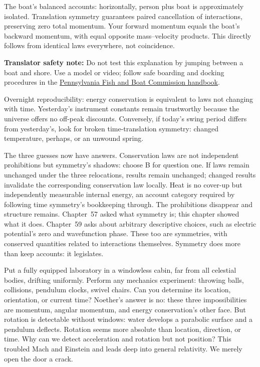The boat's balanced accounts: horizontally, person plus boat is approximately isolated. Translation symmetry guarantees paired cancellation of interactions, preserving zero total momentum. Your forward momentum equals the boat's backward momentum, with equal opposite mass--velocity products. This directly follows from identical laws everywhere, not coincidence.

\textbf{Translator safety note:} Do not test this explanation by jumping between a boat and shore. Use a model or video; follow safe boarding and docking procedures in the \href{https://pfbc.pa.gov/fishpub/summaryad2022/2022summarybook.pdf}{Pennsylvania Fish and Boat Commission handbook}.

Overnight reproducibility: energy conservation is equivalent to laws not changing with time. Yesterday's instrument constants remain trustworthy because the universe offers no off-peak discounts. Conversely, if today's swing period differs from yesterday's, look for broken time-translation symmetry: changed temperature, perhaps, or an unwound spring.

The three guesses now have answers. Conservation laws are not independent prohibitions but symmetry's shadows: choose B for question one. If laws remain unchanged under the three relocations, results remain unchanged; changed results invalidate the corresponding conservation law locally. Heat is no cover-up but independently measurable internal energy, an account category required by following time symmetry's bookkeeping through. The prohibitions disappear and structure remains. Chapter~57 asked what symmetry is; this chapter showed what it does. Chapter~59 asks about arbitrary descriptive choices, such as electric potential's zero and wavefunction phase. These too are symmetries, with conserved quantities related to interactions themselves. Symmetry does more than keep accounts: it legislates.


\begin{thought}
Put a fully equipped laboratory in a windowless cabin, far from all celestial bodies, drifting uniformly. Perform any mechanics experiment: throwing balls, collisions, pendulum clocks, swivel chairs. Can you determine its location, orientation, or current time? Noether's answer is no: these three impossibilities are momentum, angular momentum, and energy conservation's other face. But rotation is detectable without windows: water develops a parabolic surface and a pendulum deflects. Rotation seems more absolute than location, direction, or time. Why can we detect acceleration and rotation but not position? This troubled Mach and Einstein and leads deep into general relativity. We merely open the door a crack.
\end{thought}

